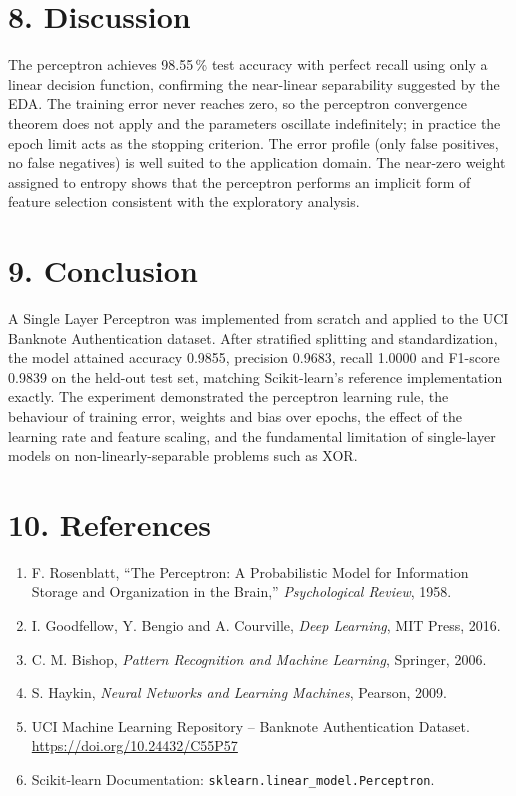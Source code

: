 \documentclass[11pt]{article}
\begin{document}
\section*{8. Discussion}
The perceptron achieves 98.55\,\% test accuracy with perfect recall using only a linear decision function, confirming the near-linear separability suggested by the EDA. The training error never reaches zero, so the perceptron convergence theorem does not apply and the parameters oscillate indefinitely; in practice the epoch limit acts as the stopping criterion. The error profile (only false positives, no false negatives) is well suited to the application domain. The near-zero weight assigned to entropy shows that the perceptron performs an implicit form of feature selection consistent with the exploratory analysis.
\section*{9. Conclusion}
A Single Layer Perceptron was implemented from scratch and applied to the UCI Banknote Authentication dataset. After stratified splitting and standardization, the model attained accuracy 0.9855, precision 0.9683, recall 1.0000 and F1-score 0.9839 on the held-out test set, matching Scikit-learn's reference implementation exactly. The experiment demonstrated the perceptron learning rule, the behaviour of training error, weights and bias over epochs, the effect of the learning rate and feature scaling, and the fundamental limitation of single-layer models on non-linearly-separable problems such as XOR.
\section*{10. References}
\begin{enumerate}
\item F. Rosenblatt, ``The Perceptron: A Probabilistic Model for Information Storage and Organization in the Brain,'' \emph{Psychological Review}, 1958.
\item I. Goodfellow, Y. Bengio and A. Courville, \emph{Deep Learning}, MIT Press, 2016.
\item C. M. Bishop, \emph{Pattern Recognition and Machine Learning}, Springer, 2006.
\item S. Haykin, \emph{Neural Networks and Learning Machines}, Pearson, 2009.
\item UCI Machine Learning Repository -- Banknote Authentication Dataset. \url{https://doi.org/10.24432/C55P57}
\item Scikit-learn Documentation: \texttt{sklearn.linear\_model.Perceptron}.
\end{enumerate}
\end{document}
